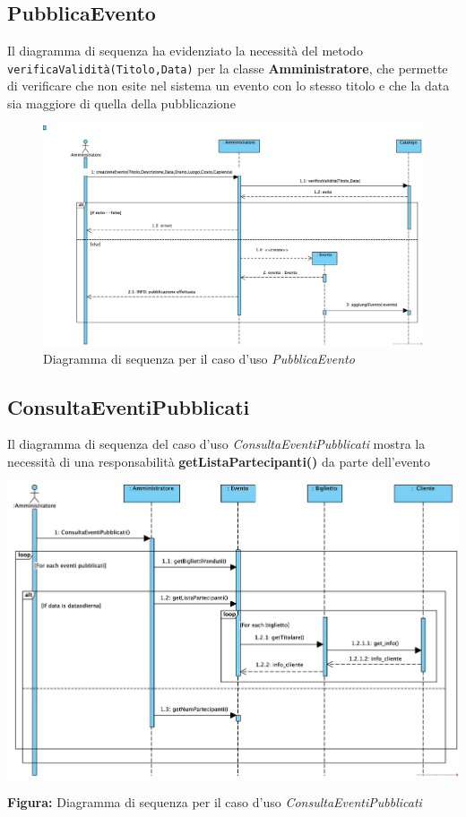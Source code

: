 \subsection{PubblicaEvento}

Il diagramma di sequenza ha evidenziato la necessità del metodo \texttt{verificaValidità(Titolo,Data)} per la classe \textbf{Amministratore}, che permette di verificare che non esite nel sistema un evento con lo stesso titolo e che la data sia maggiore di quella della pubblicazione

\begin{figure}[H]
    \centering
    \includegraphics[width=\linewidth]{assets/casid'uso/PubblicaEvento.png}
    \caption{Diagramma di sequenza per il caso d'uso \emph{PubblicaEvento}}
    \label{fig:pubblicaevento}
\end{figure}

\subsection{ConsultaEventiPubblicati}

\begin{center}
    Il diagramma di sequenza del caso d'uso \textit{ConsultaEventiPubblicati} mostra la necessità di una responsabilità \textbf{getListaPartecipanti()} da parte dell'evento

    \vspace{2ex}
    \includegraphics[width=0.8\linewidth]{assets/casid'uso/ConsultaEventiPubblicati.png}

    \vspace{1ex}
    \textbf{Figura:} Diagramma di sequenza per il caso d’uso \textit{ConsultaEventiPubblicati}
\end{center}

